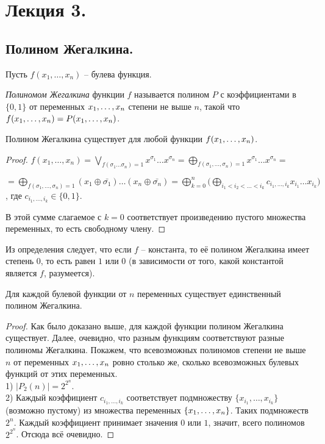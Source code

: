 \section{Лекция 3.}
\subsection{Полином Жегалкина.} 
Пусть $f(x_1, \ldots, x_n)$ -- булева функция. %
\begin{definition} \textit{Полиномом Жегалкина} функции $f$ называется полином $P$ с коэффициентами в $\{0,1\}$ от переменных $x_1, \ldots, x_n$ степени не выше $n$, такой что $f(x_1, \ldots, x_n) = P(x_1, \ldots, x_n)$. \end{definition}
\begin{statement}
    Полином Жегалкина существует для любой функции $f(x_1, \ldots, x_n)$.
\end{statement}
\begin{proof}
$f(x_1, \ldots, x_n)=\bigvee \limits_{f(\sigma_1 \ldots \sigma_n)=1} x^{\sigma_1} \ldots x^{\sigma_n}=\bigoplus \limits_{f(\sigma_1, \ldots, \sigma_n)=1} x^{\sigma_1} \ldots x^{\sigma_n}=$ 
\begin{flushright}
$
=\bigoplus \limits_{f(\sigma_1, \ldots, \sigma_n)=1} (x_1\oplus \bar{\sigma_1})\ldots(x_n\oplus \bar{\sigma_n})=\bigoplus \limits^n_{k=0} \big( \bigoplus \limits_{i_1<i_2< \ldots<i_k} c_{i_1, \ldots, i_k}x_{i_1} \ldots x_{i_k}\big) $, где  $c_{i_1, \ldots, i_k} \in \{0,1\}$.
\end{flushright} 
В этой сумме слагаемое с $k=0$ соответствует произведению пустого множества переменных, то есть свободному члену.
\end{proof}

Из определения следует, что если $f$ -- константа, то её полином Жегалкина имеет степень $0$, то есть равен $1$ или $0$ (в зависимости от того, какой константой является $f$, разумеется). 
\begin{statement}
	Для каждой булевой функции от $n$ переменных существует единственный полином Жегалкина.
\end{statement}
\begin{proof}
    Как было доказано выше, для каждой функции полином Жегалкина существует. Далее, очевидно, что разным функциям соответствуют разные полиномы Жегалкина. Покажем, что всевозможных полиномов степени не выше $n$ от переменных $x_1, \ldots, x_n$ ровно столько же, сколько всевозможных булевых функций от этих переменных. \\
    1) $|P_2(n)|=2^{2^{n}}$.\\
    2) Каждый коэффициент $c_{i_1, \ldots, i_k}$ соответствует подмножеству $\{x_{i_1}, \ldots, x_{i_k}\}$ (возможно пустому) из множества переменных $\{x_1, \ldots, x_n\}$. Таких подмножеств $2^{n}$. Каждый коэффициент принимает значения $0$ или $1$, значит, всего полиномов $2^{2^n}$. Отсюда всё очевидно.
\end{proof}
